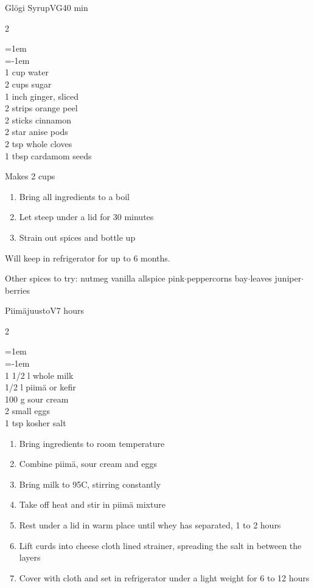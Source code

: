 \documentclass{article}
\newenvironment{recipe}[3][]
    {\begin{cardbase}[#1]{#2}{#3}
    \columnratio{0.333}
    \begin{paracol}{2}}
    {\end{paracol}\end{cardbase}}
\newcommand{\nextcolumn}{\switchcolumn}
\newenvironment{ingredients}
    {
    \begin{obeylines}
    \vspace{\parskip}
    \setlength{\parskip}{0.25em}
    \vspace{-0.25em}
    \leftskip=1em
    \parindent=-1em}
    {\end{obeylines}}
\newenvironment{steps}
    {\begin{enumerate}[leftmargin=*,topsep=0pt]}
    {\end{enumerate}}
\newcommand{\celsius}[1]{#1\textdegree{}C}
\newcommand{\tag}[1]{\hspace{1em}#1}
\newcommand{\symboltag}[2]{\tag{#1\hspace{0.4em}#2}}
\newcommand{\totaltime}[1]{\symboltag{\raisebox{-0.1em}{\small\StopWatchEnd}}{#1}}
\newcommand{\ijoin}{$\cdot{}$}
\begin{document}
\begin{recipe}{Glögi Syrup}{\tag{VG}\totaltime{40 min}}
\begin{ingredients}
1 cup water
2 cups sugar
1 inch ginger, sliced
2 strips orange peel
2 sticks cinnamon
2 star anise pods
2 tsp whole cloves
1 tbsp cardamom seeds
\end{ingredients}
\nextcolumn
Makes 2 cups
\begin{steps}
    \item Bring all ingredients to a boil
    \item Let steep under a lid for 30 minutes
    \item Strain out spices and bottle up
\end{steps}
Will keep in refrigerator for up to 6 months.

Other spices to try: nutmeg vanilla allspice pink\ijoin{}peppercorns bay\ijoin{}leaves juniper\ijoin{}berries
\end{recipe}

\begin{recipe}{Piimäjuusto}{\tag{V}\totaltime{7 hours}}
\begin{ingredients}
1 1/2 l whole milk
1/2 l piimä or kefir
100 g sour cream
2 small eggs
1 tsp kosher salt
\end{ingredients}
\nextcolumn
\begin{steps}
    \item Bring ingredients to room temperature
    \item Combine piimä, sour cream and eggs
    \item Bring milk to \celsius{95}, stirring constantly
    \item Take off heat and stir in piimä mixture
    \item Rest under a lid in warm place until whey has separated, 1 to 2 hours
    \item Lift curds into cheese cloth lined strainer, spreading the salt in between the layers
    \item Cover with cloth and set in refrigerator under a light weight for 6 to 12 hours
\end{steps}
\end{recipe}
\end{document}
